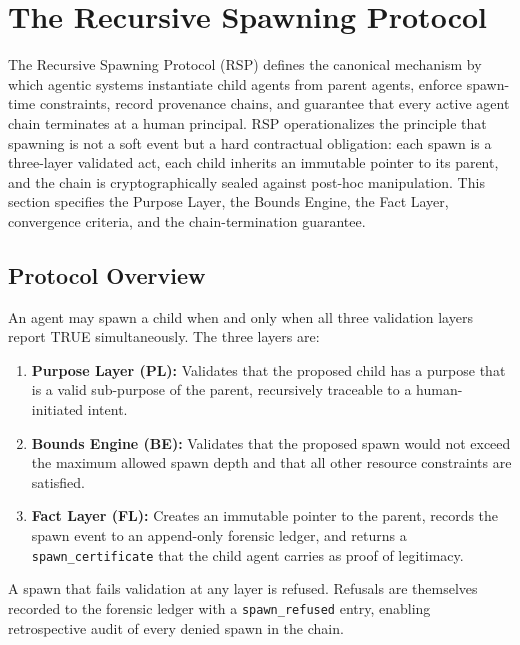 \section{The Recursive Spawning Protocol}

The Recursive Spawning Protocol (RSP) defines the canonical mechanism by which agentic systems instantiate child agents from parent agents, enforce spawn-time constraints, record provenance chains, and guarantee that every active agent chain terminates at a human principal. RSP operationalizes the principle that spawning is not a soft event but a hard contractual obligation: each spawn is a three-layer validated act, each child inherits an immutable pointer to its parent, and the chain is cryptographically sealed against post-hoc manipulation. This section specifies the Purpose Layer, the Bounds Engine, the Fact Layer, convergence criteria, and the chain-termination guarantee.

\subsection{Protocol Overview}

An agent may spawn a child when and only when all three validation layers report TRUE simultaneously. The three layers are:

\begin{enumerate}
\item \textbf{Purpose Layer (PL):} Validates that the proposed child has a purpose that is a valid sub-purpose of the parent, recursively traceable to a human-initiated intent.
\item \textbf{Bounds Engine (BE):} Validates that the proposed spawn would not exceed the maximum allowed spawn depth and that all other resource constraints are satisfied.
\item \textbf{Fact Layer (FL):} Creates an immutable pointer to the parent, records the spawn event to an append-only forensic ledger, and returns a \texttt{spawn\_certificate} that the child agent carries as proof of legitimacy.
\end{enumerate}

A spawn that fails validation at any layer is refused. Refusals are themselves recorded to the forensic ledger with a \texttt{spawn\_refused} entry, enabling retrospective audit of every denied spawn in the chain.

